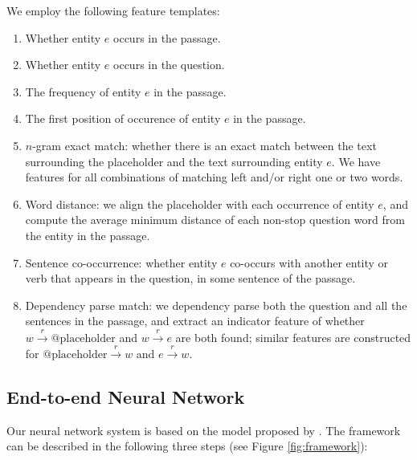 We employ the following feature templates:
\begin{enumerate}[1.]
    \setlength\itemsep{-0.1em}
    \item
        Whether entity $e$ occurs in the passage.
    \item
        Whether entity $e$ occurs in the question.
    \item
        The frequency of entity $e$ in the passage.
    \item
        The first position of occurence of entity $e$ in the passage.
    \item
        $n$-gram exact match: whether there is an exact match between the text surrounding the placeholder and the text surrounding entity $e$. We have features for all combinations of matching left and/or right one or two words.
    \item
        Word distance: we align the placeholder with each occurrence of entity $e$, and compute the average minimum distance of each non-stop question word from the entity in the passage.
    \item
        Sentence co-occurrence: whether entity $e$ co-occurs with another entity or verb that appears in the question, in some sentence of the passage.
    \item
        Dependency parse match: we dependency parse both the question and all the sentences in the passage, and extract an indicator feature of whether $w \xrightarrow{r} \text{@placeholder}$ and $w \xrightarrow{r} e$ are both found; similar features are constructed for $\text{@placeholder} \xrightarrow{r} w$ and $e \xrightarrow{r} w$.
\end{enumerate}



\subsection{End-to-end Neural Network}

Our neural network system is based on the  model proposed by \cite{hermann2015teaching}. The framework can be described in the following three steps (see Figure \ref{fig:framework}):


